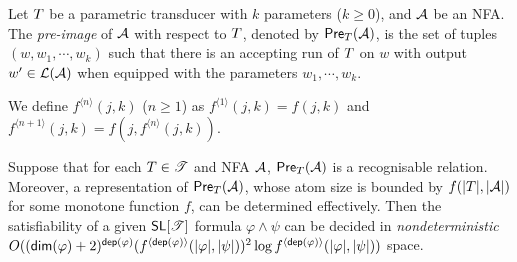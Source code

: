 
\medskip

Let $T$ be a parametric transducer %
with $k$ parameters ($k\geq 0$), and $\mathcal{A}$ be an NFA. The \emph{pre-image} of $\mathcal{A}$ with respect to $T$, denoted by $\textsf{Pre}_{T}(\mathcal{A})$, is the set of tuples $(w, w_1,\cdots, w_k)$ such that there is an accepting run of $T$ on $w$ with output $w'\in \mathcal{L}(\mathcal{A})$ when equipped with the parameters $w_1,\cdots, w_k$. 


We define $f^{\langle n \rangle}(j, k)$ ($n\geq 1$) as $f^{\langle 1 \rangle}(j,k)= f(j, k)$ and $f^{\langle n+1 \rangle }(j, k) = f(j, f^{\langle n \rangle}(j,k))$. 


\begin{theorem}\label{thm-generic-dec}
Suppose that %
for each $T \in \mathscr{T}$ and NFA $\mathcal{A}$, $\textsf{Pre}_{T}(\mathcal{A})$ is a recognisable relation.  Moreover, a representation of $\textsf{Pre}_{T}(\mathcal{A})$, whose atom size is bounded by $f(|T|, |\mathcal{A}|)$ for some monotone function $f$, can be determined effectively. Then the satisfiability of a given $\textsf{SL}[\mathscr{T}]$ formula $\varphi \wedge \psi$ can be decided in \emph{nondeterministic} 
$O((\mathsf{dim}(\varphi)+2)^{\mathsf{dep}(\varphi)} (f^{\langle \mathsf{dep}(\varphi) \rangle}(|\varphi|, |\psi|))^2 \log f^{\langle \mathsf{dep}(\varphi) \rangle}(|\varphi|, |\psi|))$ space.
\end{theorem}

